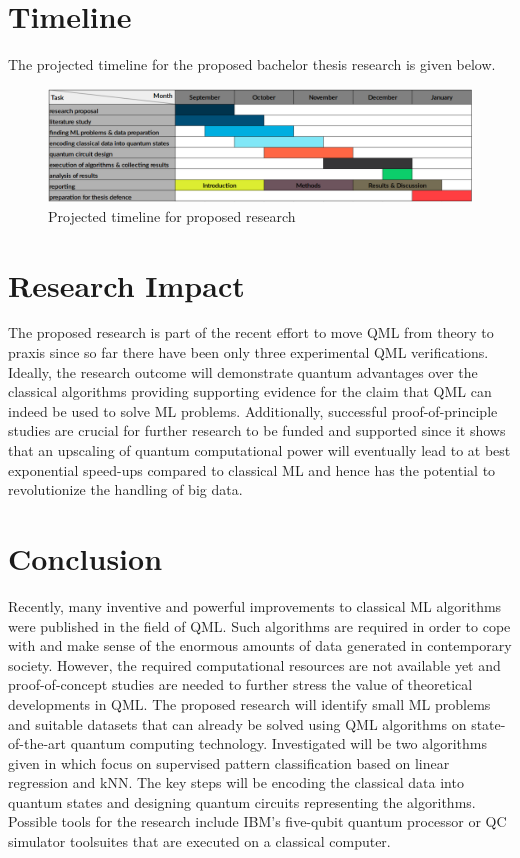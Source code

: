 \documentclass[a4paper]{article}
\newcommand*{\0}{$\ket{0}$}
\newcommand*{\1}{$\ket{1}$}
\begin{document}
\section{Timeline}
\label{sec:timeline}

The projected timeline for the proposed bachelor thesis research is given below.

\begin{figure}[!ht]
\centering
\includegraphics[scale=0.385]{ready_timeline.png}
\caption{Projected timeline for proposed research}
\end{figure}

\section{Research Impact}
\label{sec:research impact}
The proposed research is part of the recent effort to move QML from theory to praxis since so far there have been only three experimental QML verifications. Ideally, the research outcome will demonstrate quantum advantages over the classical algorithms providing supporting evidence for the claim that QML can indeed be used to solve ML problems. Additionally, successful proof-of-principle studies are crucial for further research to be funded and supported since it shows that an upscaling of quantum computational power will eventually lead to at best exponential speed-ups compared to classical ML and hence has the potential to revolutionize the handling of big data.

\section{Conclusion}
\label{sec:conclusion}
Recently, many inventive and powerful improvements to classical ML algorithms were published in the field of QML. Such algorithms are required in order to cope with and make sense of the enormous amounts of data generated in contemporary society. However, the required computational resources are not available yet and proof-of-concept studies are needed to further stress the value of theoretical developments in QML. The proposed research will identify small ML problems and suitable datasets that can already be solved using QML algorithms on state-of-the-art quantum computing technology. Investigated will be two algorithms given in \cite{Schuld2014, Schuld2016} which focus on supervised pattern classification based on linear regression and kNN. The key steps will be encoding the classical data into quantum states and designing quantum circuits representing the algorithms. Possible tools for the research include IBM's five-qubit quantum processor or QC simulator toolsuites that are executed on a classical computer.
\end{document}
